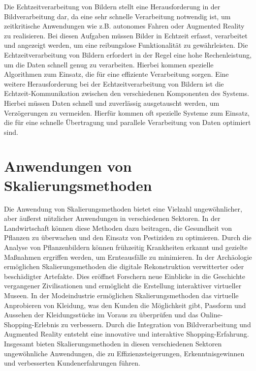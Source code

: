     Die Echtzeitverarbeitung von Bildern stellt eine Herausforderung in der Bildverarbeitung dar, da eine sehr schnelle Verarbeitung notwendig ist, um zeitkritische Anwendungen wie z.B. autonomes Fahren oder Augmented Reality zu realisieren.
    Bei diesen Aufgaben müssen Bilder in Echtzeit erfasst, verarbeitet und angezeigt werden, um eine reibungslose Funktionalität zu gewährleisten.
    Die Echtzeitverarbeitung von Bildern erfordert in der Regel eine hohe Rechenleistung, um die Daten schnell genug zu verarbeiten.
    Hierbei kommen spezielle Algorithmen zum Einsatz, die für eine effiziente Verarbeitung sorgen.
    Eine weitere Herausforderung bei der Echtzeitverarbeitung von Bildern ist die Echtzeit-Kommunikation zwischen den verschiedenen Komponenten des Systems. 
    Hierbei müssen Daten schnell und zuverlässig ausgetauscht werden, um Verzögerungen zu vermeiden. 
    Hierfür kommen oft spezielle Systeme zum Einsatz, die für eine schnelle Übertragung und parallele Verarbeitung von Daten optimiert sind.
\section{Anwendungen von Skalierungsmethoden}
    Die Anwendung von Skalierungsmethoden bietet eine Vielzahl ungewöhnlicher, aber äußerst nützlicher Anwendungen in verschiedenen Sektoren.
    In der Landwirtschaft können diese Methoden dazu beitragen, die Gesundheit von Pflanzen zu überwachen und den Einsatz von Pestiziden zu optimieren.
    Durch die Analyse von Pflanzenbildern können frühzeitig Krankheiten erkannt und gezielte Maßnahmen ergriffen werden, um Ernteausfälle zu minimieren.
    In der Archäologie ermöglichen Skalierungsmethoden die digitale Rekonstruktion verwitterter oder beschädigter Artefakte.
    Dies eröffnet Forschern neue Einblicke in die Geschichte vergangener Zivilisationen und ermöglicht die Erstellung interaktiver virtueller Museen.
    In der Modeindustrie ermöglichen Skalierungsmethoden das virtuelle Anprobieren von Kleidung, was den Kunden die Möglichkeit gibt, Passform und Aussehen der Kleidungsstücke im Voraus zu überprüfen und das Online-Shopping-Erlebnis zu verbessern.
    Durch die Integration von Bildverarbeitung und Augmented Reality entsteht eine innovative und interaktive Shopping-Erfahrung.
    Insgesamt bieten Skalierungsmethoden in diesen verschiedenen Sektoren ungewöhnliche Anwendungen, die zu Effizienzsteigerungen, Erkenntnisgewinnen und verbesserten Kundenerfahrungen führen.
